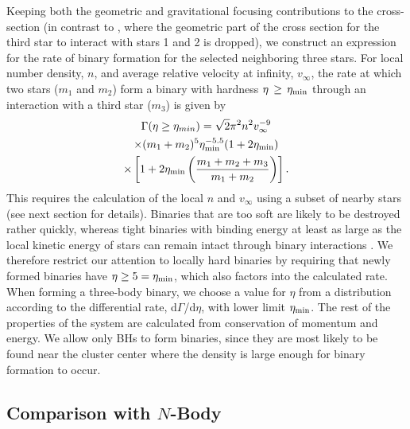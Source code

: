 \documentclass[12pt,preprint]{aastex}
\begin{document}
Keeping both the geometric and gravitational focusing contributions to
the cross-section (in contrast to \citealt{Ivanova2010}, where the  %
geometric part of the cross section for the third star to interact
with stars 1 and 2 is dropped), we construct an expression for the
rate of binary formation for the selected neighboring three stars.
 For local number density, $n$, and
average relative velocity at infinity, $v_{\infty}$, the rate at which
two stars ($m_1$ and $m_2$) form a binary with hardness $\eta \, \geq
\, \eta_{\rm min}$ through an interaction with a third star ($m_3$) is
given by
\begin{multline}
\Gamma(\eta \geq \eta_{min}) = \sqrt{2} \pi^2 n^2
      {v_{\infty}^{-9}} \\ \times (m_1 + m_2)^5 \eta_{\rm min}^{-5.5} (1 + 2
      \eta_{\rm min}) \\ \times \left[ 1+2 \eta_{\rm min} \left( \frac{ m_1 + m_2 +
            m_3}{m_1 + m_2 } \right) \right].
\label{eq:Gamma}
\end{multline}
This requires the calculation of the local $n$ and $v_{\infty}$ using a subset
of nearby stars (see next section for details).
Binaries that are too soft are likely to be destroyed rather quickly,
whereas tight binaries with binding energy at least as large as the 
local kinetic energy of stars can remain intact through binary interactions
 \citep{Heggie1975}. We therefore restrict our attention to locally
 hard binaries by requiring that newly formed binaries have
$\eta \geq 5 = \eta_{\rm min}$, which also factors into the calculated rate.
When forming a three-body binary, we choose a
value for $\eta$ from a distribution according to the differential
rate, d$\Gamma$/d$\eta$, with lower limit $\eta_{\rm min}$. The rest
of the properties of the system are calculated from conservation of
momentum and energy.
We allow only BHs to form binaries, since they 
are most likely to be found near the cluster center where the density is large 
enough for binary formation to occur. 



\subsection{Comparison with $N$-Body}
\end{document}

